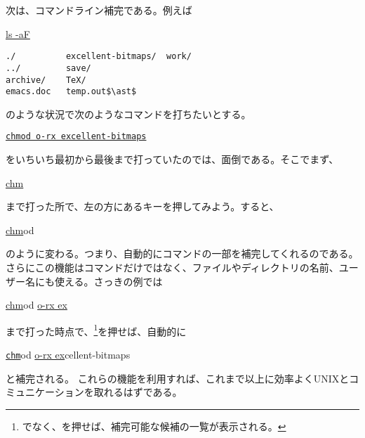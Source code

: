 次は、コマンドライン補完である。例えば
\begin{commandline2}
\prompt \underline{ls -aF}
\begin{verbatim}
./          excellent-bitmaps/  work/
../         save/
archive/    TeX/
emacs.doc   temp.out$\ast$
\end{verbatim}
\end{commandline2} \noindent
のような状況で次のようなコマンドを打ちたいとする。
\begin{commandline2}
\prompt \underline{\tt chmod o-rx excellent-bitmaps}
\end{commandline2} \noindent
をいちいち最初から最後まで打っていたのでは、面倒である。そこでまず、
\begin{commandline2}
\prompt \underline{chm}
\end{commandline2} \noindent
まで打った所で、左の方にあるキーを押してみよう。すると、
\begin{commandline2}
\prompt \underline{chm}od\ \cursor
\end{commandline2} \noindent
のように変わる。つまり、自動的にコマンドの一部を補完してくれるのである。さらにこの機能はコマンドだけではなく、ファイルやディレクトリの名前、ユーザー名にも使える。さっきの例では
\begin{commandline2}
\prompt \underline{chm}od \underline{o-rx ex}
\end{commandline2} \noindent
まで打った時点で、\footnote{でなく、を押せば、補完可能な候補の一覧が表示される。}を押せば、自動的に
\begin{commandline2}
\prompt \underline{\tt chm}od \underline{o-rx ex}cellent-bitmaps
\end{commandline2} \noindent
と補完される。
これらの機能を利用すれば、これまで以上に効率よくUNIXとコミュニケーションを取れるはずである。

